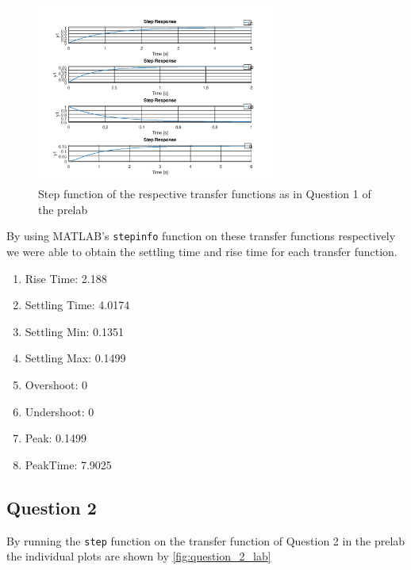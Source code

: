 \documentclass[12pt, a4paper]{article}
\begin{document}
		\begin{figure}[H]
			\centering
			\includegraphics[width=0.7\textwidth]{Images/question_1_lab.png}
			\caption{Step function of the respective transfer functions as in Question 1 of the prelab}
			\label{fig:question_1_lab} 
		\end{figure}
		
		By using MATLAB's \texttt{stepinfo} function on these transfer functions respectively we were able to obtain the  settling time and rise time for each transfer function. \\
		\begin{enumerate}
			\item Rise Time: 2.188
			\item Settling Time: 4.0174
			\item Settling Min: 0.1351
			\item Settling Max: 0.1499
			\item Overshoot: 0
			\item Undershoot: 0
			\item Peak: 0.1499
			\item PeakTime: 7.9025
		\end{enumerate}

		\subsection{Question 2} %
		\label{sub:question_2}
		By running the \texttt{step} function on the transfer function of Question 2 in the prelab the individual plots are shown by \ref{fig:question_2_lab}
\end{document}
